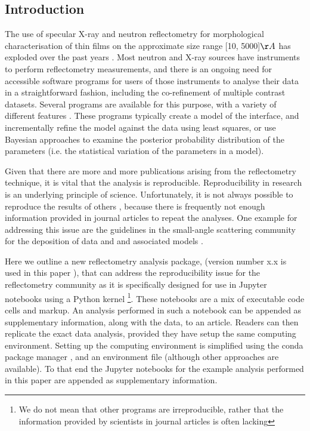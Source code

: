 \documentclass[12pt]{article}
\begin{document}
\subsection*{Introduction}
The use of specular X-ray and neutron reflectometry for morphological characterisation of thin films on the approximate size range [10, 5000]$\AA$ has exploded over the past years \cite{Wood2017, Daillant2009}. Most neutron and X-ray sources have instruments to perform reflectometry measurements, and there is an ongoing need for accessible software programs for users of those instruments to analyse their data in a straightforward fashion, including the co-refinement of multiple contrast datasets.  Several programs are available for this purpose, with a variety of different features \cite{Bjorck2007, Gerelli2016, Kienzle2011, Nelson2006}. These programs typically create a model of the interface, and incrementally refine the model against the data using least squares, or use Bayesian approaches \cite{Sivia2006, 2010arXiv1008.4686H} to examine the posterior probability distribution of the parameters (i.e. the statistical variation of the parameters in a model).

Given that there are more and more publications arising from the reflectometry technique, it is vital that the analysis is reproducible. Reproducibility in research is an underlying principle of science. Unfortunately, it is not always possible to reproduce the results of others \cite{Stark2018}, because there is frequently not enough information provided in journal articles to repeat the analyses. One example for addressing this issue are the guidelines in the small-angle scattering community for the deposition of data and and associated models \cite{Trewhella:jc5010}.

Here we outline a new reflectometry analysis package,  (version number x.x is used in this paper \cite{refnx}), that can address the reproducibility issue for the reflectometry community as it is specifically designed for use in Jupyter notebooks \cite{Kluyver:2016aa} using a Python kernel \footnote{We do not mean that other programs are irreproducible, rather that the information provided by scientists in journal articles is often lacking}.
These notebooks are a mix of executable code cells and markup. An analysis performed in such a notebook can be appended as supplementary information, along with the data, to an article. Readers can then replicate the exact data analysis, provided they have setup the same computing environment. Setting up the computing environment is simplified using the conda package manager \cite{conda}, and an environment file (although other approaches are available). To that end the Jupyter notebooks for the example analysis performed in this paper are appended as supplementary information.
\end{document}
